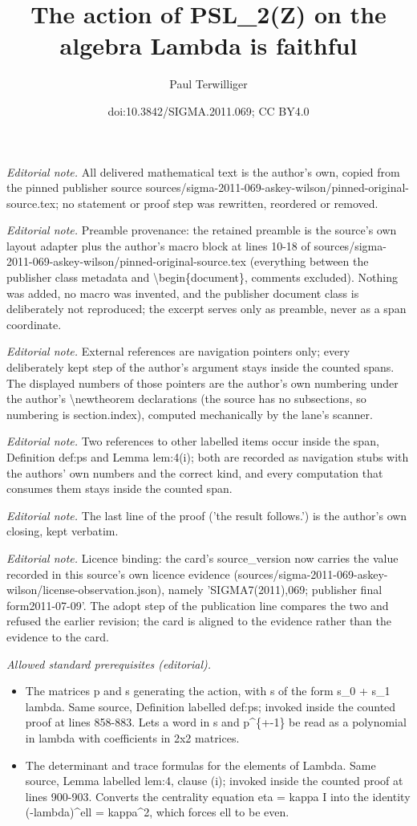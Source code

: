 \documentclass[10pt,a4paper]{amsart}
\title{The action of PSL\_2(Z) on the algebra Lambda is faithful}
\author{Paul Terwilliger}
\date{doi:10.3842/SIGMA.2011.069; CC BY4.0}
\begin{document}
\maketitle
\noindent\textit{Editorial note.} All delivered mathematical text is the author's own, copied from the pinned publisher source sources/sigma-2011-069-askey-wilson/pinned-original-source.tex; no statement or proof step was rewritten, reordered or removed.\par\medskip
\noindent\textit{Editorial note.} Preamble provenance: the retained preamble is the source's own layout adapter plus the author's macro block at lines 10-18 of sources/sigma-2011-069-askey-wilson/pinned-original-source.tex (everything between the publisher class metadata and \textbackslash{}begin\{document\}, comments excluded). Nothing was added, no macro was invented, and the publisher document class is deliberately not reproduced; the excerpt serves only as preamble, never as a span coordinate.\par\medskip
\noindent\textit{Editorial note.} External references are navigation pointers only; every deliberately kept step of the author's argument stays inside the counted spans. The displayed numbers of those pointers are the author's own numbering under the author's \textbackslash{}newtheorem declarations (the source has no subsections, so numbering is section.index), computed mechanically by the lane's scanner.\par\medskip
\noindent\textit{Editorial note.} Two references to other labelled items occur inside the span, Definition def:ps and Lemma lem:4(i); both are recorded as navigation stubs with the authors' own numbers and the correct kind, and every computation that consumes them stays inside the counted span.\par\medskip
\noindent\textit{Editorial note.} The last line of the proof ('the result follows.') is the author's own closing, kept verbatim.\par\medskip
\noindent\textit{Editorial note.} Licence binding: the card's source\_version now carries the value recorded in this source's own licence evidence (sources/sigma-2011-069-askey-wilson/license-observation.json), namely 'SIGMA7(2011),069; publisher final form2011-07-09'. The adopt step of the publication line compares the two and refused the earlier revision; the card is aligned to the evidence rather than the evidence to the card.\par\medskip
\noindent\textit{Allowed standard prerequisites (editorial).}\begin{itemize}
\item The matrices p and s generating the action, with s of the form s\_0 + s\_1 lambda. Same source, Definition labelled def:ps; invoked inside the counted proof at lines 858-883. Lets a word in s and p\textasciicircum{}\{+-1\} be read as a polynomial in lambda with coefficients in 2x2 matrices.
\item The determinant and trace formulas for the elements of Lambda. Same source, Lemma labelled lem:4, clause (i); invoked inside the counted proof at lines 900-903. Converts the centrality equation eta = kappa I into the identity (-lambda)\textasciicircum{}ell = kappa\textasciicircum{}2, which forces ell to be even.
\end{itemize}\medskip
\end{document}
